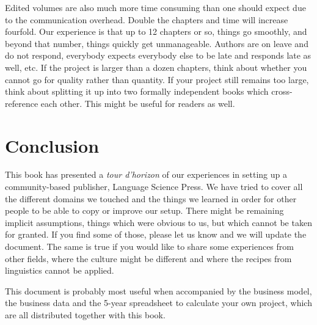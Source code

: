 \documentclass[nonflat,modfonts,output=book] {langsci/langscibook}
\begin{document}
Edited volumes are also much more  time consuming than one should expect due to the communication overhead. Double the chapters and time will increase fourfold. Our experience is that up to 12 chapters or so, things go smoothly, and beyond that number, things quickly get unmanageable. Authors are on leave and do not respond, everybody expects everybody else to be late and responds late as well, etc. If the project is larger than a dozen chapters, think about whether you cannot go for quality rather than quantity. If your project still remains too large, think about splitting it up into two formally independent books which cross-reference each other. This might be useful for readers as well. 
 
\chapter{Conclusion} 
This book has presented a \textit{tour d'horizon} of our experiences in setting up a com\-mu\-nity-based publisher, Language Science Press. We have tried to cover all the different domains we touched and the things we learned in order for other people to be able to copy or improve our setup. 
There might be remaining implicit assumptions, things which were obvious to us, but which cannot be taken for granted. If you find some of those, please let us know and we will update the document. The same is true if  you would like to share some experiences from other fields, where the culture might be different and where the recipes from linguistics cannot be applied. 

This document is probably most useful when accompanied by the business model, the business data and the 5-year spreadsheet to calculate your own project, which are all distributed together with this book. 
\end{document}

